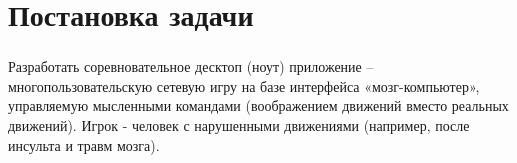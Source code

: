 \section{Постановка задачи}

\begin{frame}
\frametitle{\insertsection} 
Разработать соревновательное десктоп (ноут) приложение – многопользовательскую сетевую игру на базе интерфейса «мозг-компьютер», управляемую мысленными командами (воображением движений вместо реальных движений). Игрок - человек с нарушенными движениями (например, после инсульта и травм мозга).
\end{frame}